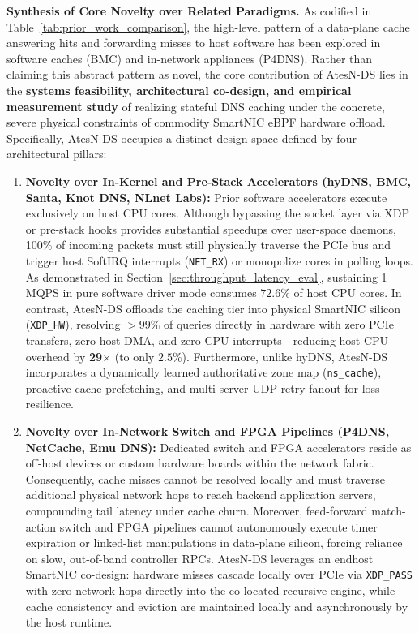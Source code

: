 \documentclass[a4paper,fleqn,colorlinks,hidelinks]{cas-sc}
\begin{document}
\textbf{Synthesis of Core Novelty over Related Paradigms.} 
As codified in Table~\ref{tab:prior_work_comparison}, the high-level pattern of a data-plane cache answering hits and forwarding misses to host software has been explored in software caches (BMC) and in-network appliances (P4DNS). Rather than claiming this abstract pattern as novel, the core contribution of AtesN-DS lies in the \textbf{systems feasibility, architectural co-design, and empirical measurement study} of realizing stateful DNS caching under the concrete, severe physical constraints of commodity SmartNIC eBPF hardware offload. Specifically, AtesN-DS occupies a distinct design space defined by four architectural pillars:
\begin{enumerate}
    \item \textbf{Novelty over In-Kernel and Pre-Stack Accelerators (hyDNS, BMC, Santa, Knot DNS, NLnet Labs):} Prior software accelerators execute exclusively on host CPU cores. Although bypassing the socket layer via XDP or pre-stack hooks provides substantial speedups over user-space daemons, 100\% of incoming packets must still physically traverse the PCIe bus and trigger host SoftIRQ interrupts (\texttt{NET\_RX}) or monopolize cores in polling loops. As demonstrated in Section~\ref{sec:throughput_latency_eval}, sustaining 1\,MQPS in pure software driver mode consumes $72.6\%$ of host CPU cores. In contrast, AtesN-DS offloads the caching tier into physical SmartNIC silicon (\texttt{XDP\_HW}), resolving $>99\%$ of queries directly in hardware with zero PCIe transfers, zero host DMA, and zero CPU interrupts—reducing host CPU overhead by \textbf{29$\times$} (to only $2.5\%$). Furthermore, unlike hyDNS, AtesN-DS incorporates a dynamically learned authoritative zone map (\texttt{ns\_cache}), proactive cache prefetching, and multi-server UDP retry fanout for loss resilience.
    \item \textbf{Novelty over In-Network Switch and FPGA Pipelines (P4DNS, NetCache, Emu DNS):} Dedicated switch and FPGA accelerators reside as off-host devices or custom hardware boards within the network fabric. Consequently, cache misses cannot be resolved locally and must traverse additional physical network hops to reach backend application servers, compounding tail latency under cache churn. Moreover, feed-forward match-action switch and FPGA pipelines cannot autonomously execute timer expiration or linked-list manipulations in data-plane silicon, forcing reliance on slow, out-of-band controller RPCs. AtesN-DS leverages an endhost SmartNIC co-design: hardware misses cascade locally over PCIe via \texttt{XDP\_PASS} with zero network hops directly into the co-located recursive engine, while cache consistency and eviction are maintained locally and asynchronously by the host runtime.

\end{enumerate}
\end{document}
